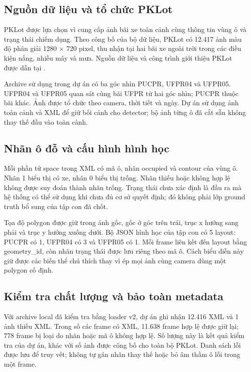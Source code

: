 \subsection{Nguồn dữ liệu và tổ chức PKLot}
PKLot được lựa chọn vì cung cấp ảnh bãi xe toàn cảnh cùng thông tin vùng ô và trạng thái chiếm dụng. Theo công bố của bộ dữ liệu, PKLot có 12.417 ảnh màu độ phân giải 1280 \(\times\) 720 pixel, thu nhận tại hai bãi xe ngoài trời trong các điều kiện nắng, nhiều mây và mưa. Nguồn dữ liệu và công trình giới thiệu PKLot được dẫn tại \cite{pklot,pklotdata}.

Archive sử dụng trong dự án có ba góc nhìn PUCPR, UFPR04 và UFPR05. UFPR04 và UFPR05 quan sát cùng bãi UFPR từ hai góc nhìn; PUCPR thuộc bãi khác. Ảnh được tổ chức theo camera, thời tiết và ngày. Dự án sử dụng ảnh toàn cảnh và XML để giữ bối cảnh cho detector; bộ ảnh từng ô đã cắt sẵn không thay thế đầu vào toàn cảnh.

\subsection{Nhãn ô đỗ và cấu hình hình học}
Mỗi phần tử space trong XML có mã ô, nhãn occupied và contour của vùng ô. Nhãn 1 biểu thị có xe, nhãn 0 biểu thị trống. Nhãn thiếu hoặc không hợp lệ không được suy đoán thành nhãn trống. Trạng thái chưa xác định là đầu ra mà hệ thống có thể sử dụng khi chưa đủ cơ sở quyết định; đó không phải lớp ground truth bổ sung của tập con đã chốt.

Tọa độ polygon được giữ trong ảnh gốc, gốc ở góc trên trái, trục x hướng sang phải và trục y hướng xuống dưới. Bộ JSON hình học của tập con có 5 layout: PUCPR có 1, UFPR04 có 3 và UFPR05 có 1. Mỗi frame liên kết đến layout bằng geometry\_id, còn nhãn trạng thái được lưu riêng theo mã ô. Cách biểu diễn này giữ được các biến thể chú thích thay vì ép mọi ảnh cùng camera dùng một polygon cố định.

\subsection{Kiểm tra chất lượng và bảo toàn metadata}
Với archive local đã kiểm tra bằng loader v2, dự án ghi nhận 12.416 XML và 1 ảnh thiếu XML. Trong số các frame có XML, 11.638 frame hợp lệ được giữ lại; 778 frame bị loại do nhãn hoặc mã ô không hợp lệ. Số lượng này là kết quả kiểm tra của dự án, khác với số ảnh được công bố cho toàn bộ PKLot. Danh sách lỗi được lưu để truy vết; không tự gán nhãn thay thế hoặc bỏ âm thầm ô lỗi trong một frame.

